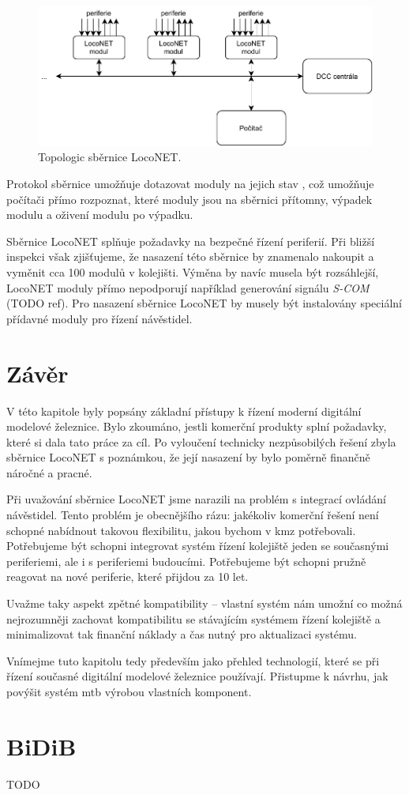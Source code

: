 \begin{figure}[ht!]
\includegraphics[width=\textwidth]{data/loconet.pdf}
\caption{Topologic sběrnice LocoNET.}
\label{fig:loconet-topology}
\end{figure}

Protokol sběrnice umožňuje dotazovat moduly na jejich stav \cite{loconet-specs},
což umožňuje počítači přímo rozpoznat, které moduly jsou na sběrnici přítomny,
výpadek modulu a oživení modulu po výpadku.

Sběrnice LocoNET splňuje požadavky na bezpečné řízení periferií. Při bližší
inspekci však zjišťujeme, že nasazení této sběrnice by znamenalo nakoupit a
vyměnit cca 100 modulů v kolejišti. Výměna by navíc musela být rozsáhlejší,
LocoNET moduly přímo nepodporují například generování signálu \textit{S-COM}
(TODO ref). Pro nasazení sběrnice LocoNET by musely být instalovány speciální
přídavné moduly pro řízení návěstidel.

\section{Závěr}

V této kapitole byly popsány základní přístupy k řízení moderní digitální
modelové železnice. Bylo zkoumáno, jestli komerční produkty splní požadavky,
které si dala tato práce za cíl. Po vyloučení technicky nezpůsobilých řešení
zbyla sběrnice LocoNET s poznámkou, že její nasazení by bylo poměrně finančně
náročné a pracné.

Při uvažování sběrnice LocoNET jsme narazili na problém s integrací ovládání
návěstidel. Tento problém je obecnějšího rázu: jakékoliv komerční řešení není
schopné nabídnout takovou flexibilitu, jakou bychom v \gls{kmz} potřebovali.
Potřebujeme být schopni integrovat systém řízení kolejiště jeden se současnými
periferiemi, ale i s periferiemi budoucími. Potřebujeme být schopni pružně
reagovat na nové periferie, které přijdou za 10 let.

Uvažme taky aspekt zpětné kompatibility – vlastní systém nám umožní co možná
nejrozumněji zachovat kompatibilitu se stávajícím systémem řízení kolejiště
a minimalizovat tak finanční náklady a čas nutný pro aktualizaci systému.

Vnímejme tuto kapitolu tedy především jako přehled technologií, které se
při řízení současné digitální modelové železnice používají. Přistupme k návrhu,
jak povýšit systém \gls{mtb} výrobou vlastních komponent.

\section{BiDiB}

TODO

